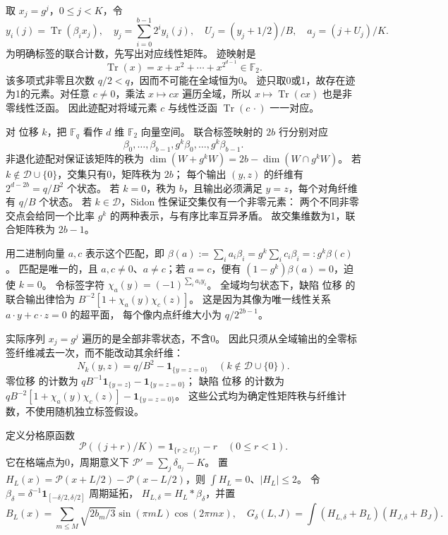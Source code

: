 \documentclass[UTF8,a4paper,11pt,fontset=fandol]{ctexart}
\theoremstyle{remark}
\begin{document}
取 $x_j=g^j$，$0\le j<K$，令
\[
 y_i(j)=\operatorname{Tr}(\beta_ix_j),\quad
 y_j=\sum_{i=0}^{b-1}2^iy_i(j),\quad
 U_j=(y_j+1/2)/B,\quad a_j=(j+U_j)/K.
\]
为明确标签的联合计数，先写出对应线性矩阵。
迹映射是
\[
 \operatorname{Tr}(x)=x+x^2+\cdots+x^{2^{d-1}}\in\mathbb F_2.
\]
该多项式非零且次数 $q/2<q$，因而不可能在全域恒为0。
迹只取0或1，故存在迹为1的元素。对任意 $c\ne0$，乘法 $x\mapsto cx$
遍历全域，所以 $x\mapsto\operatorname{Tr}(cx)$ 也是非零线性泛函。
因此迹配对将域元素 $c$ 与线性泛函 $\operatorname{Tr}(c\,\cdot)$ 一一对应。

对 位移 $k$，把 $\mathbb F_q$ 看作 $d$ 维 $\mathbb F_2$ 向量空间。
联合标签映射的 $2b$ 行分别对应
\[
 \beta_0,\ldots,\beta_{b-1},g^k\beta_0,\ldots,g^k\beta_{b-1}.
\]
非退化迹配对保证该矩阵的秩为
$\dim(W+g^kW)=2b-\dim(W\cap g^kW)$。
若 $k\notin\mathcal D\cup\{0\}$，交集只有0，矩阵秩为 $2b$；
每个输出 $(y,z)$ 的纤维有 $2^{d-2b}=q/B^2$ 个状态。
若 $k=0$，秩为 $b$，且输出必须满足 $y=z$，每个对角纤维有 $q/B$ 个状态。
若 $k\in\mathcal D$，Sidon 性保证交集仅有一个非零元素：
两个不同非零交点会给同一个比率 $g^k$ 的两种表示，与有序比率互异矛盾。
故交集维数为1，联合矩阵秩为 $2b-1$。

用二进制向量 $a,c$ 表示这个匹配，即
$\beta(a):=\sum_i a_i\beta_i=g^k\sum_i c_i\beta_i=:g^k\beta(c)$。
匹配是唯一的，且 $a,c\ne0$、$a\ne c$；若 $a=c$，便有
$(1-g^k)\beta(a)=0$，迫使 $k=0$。
令标签字符 $\chi_a(y)=(-1)^{\sum_i a_iy_i}$。
全域均匀状态下，缺陷 位移 的联合输出律恰为
$B^{-2}[1+\chi_a(y)\chi_c(z)]$。
这是因为其像为唯一线性关系 $a\cdot y+c\cdot z=0$ 的超平面，
每个像内点纤维大小为 $q/2^{2b-1}$。

实际序列 $x_j=g^j$ 遍历的是全部非零状态，不含0。
因此只须从全域输出的全零标签纤维减去一次，而不能改动其余纤维：
\begin{equation}\label{eq:paperlabelcount}
 N_k(y,z)=q/B^2-\mathbf1_{\{y=z=0\}}
 \quad(k\notin\mathcal D\cup\{0\}).
\end{equation}
零位移 的计数为
$qB^{-1}\mathbf1_{\{y=z\}}-\mathbf1_{\{y=z=0\}}$；
缺陷 位移 的计数为
$qB^{-2}[1+\chi_a(y)\chi_c(z)]-\mathbf1_{\{y=z=0\}}$。
这些公式均为确定性矩阵秩与纤维计数，不使用随机独立标签假设。

定义分格原函数
\[
 \mathcal P((j+r)/K)=\mathbf1_{\{r\ge U_j\}}-r\quad(0\le r<1).
\]
它在格端点为0，周期意义下 $\mathcal P'=\sum_j\delta_{a_j}-K$。
置 $H_L(x)=\mathcal P(x+L/2)-\mathcal P(x-L/2)$，则 $\int H_L=0$、$|H_L|\le2$。
令 $\beta_\delta=\delta^{-1}\mathbf1_{[-\delta/2,\delta/2]}$ 周期延拓，
$H_{L,\delta}=H_L*\beta_\delta$，并置
\[
 B_L(x)=\sum_{m\le M}\sqrt{2b_m/3}\sin(\pi mL)\cos(2\pi mx),
 \quad G_\delta(L,J)=\int(H_{L,\delta}+B_L)(H_{J,\delta}+B_J).
\]
\end{document}
